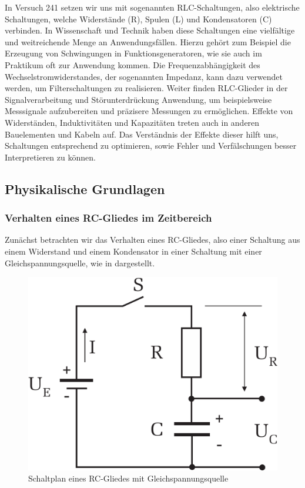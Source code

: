 In Versuch 241 setzen wir uns mit sogenannten RLC-Schaltungen, also elektrische Schaltungen, welche Widerstände (R), Spulen (L) und Kondensatoren (C) verbinden. In Wissenschaft und Technik haben diese Schaltungen eine vielfältige und weitreichende Menge an Anwendungsfällen. Hierzu gehört zum Beispiel die Erzeugung von Schwingungen in Funktionsgeneratoren, wie sie auch im Praktikum oft zur Anwendung kommen. Die Frequenzabhängigkeit des Wechselstromwiderstandes, der sogenannten Impedanz, kann dazu verwendet werden, um Filterschaltungen zu realisieren. Weiter finden RLC-Glieder in der Signalverarbeitung und Störunterdrückung Anwendung, um beispielsweise Messsignale aufzubereiten und präzisere Messungen zu ermöglichen. Effekte von Widerständen, Induktivitäten und Kapazitäten treten auch in anderen Bauelementen und Kabeln auf. Das Verständnis der Effekte dieser hilft uns, Schaltungen entsprechend zu optimieren, sowie Fehler und Verfälschungen besser Interpretieren zu können.

\subsection{Physikalische Grundlagen}

\subsubsection*{Verhalten eines RC-Gliedes im Zeitbereich}
Zunächst betrachten wir das Verhalten eines RC-Gliedes, also einer Schaltung aus einem Widerstand und einem Kondensator in einer Schaltung mit einer Gleichspannungsquelle, wie in  dargestellt.

\begin{figure}[H]
  \centering
  \includegraphics[width=.70\textwidth]{files/script/schaltpl_rc_dc.png}
  \caption{Schaltplan eines RC-Gliedes mit Gleichspannungsquelle}
  \label{fig:schaltpl_rc_ac}
\end{figure}


